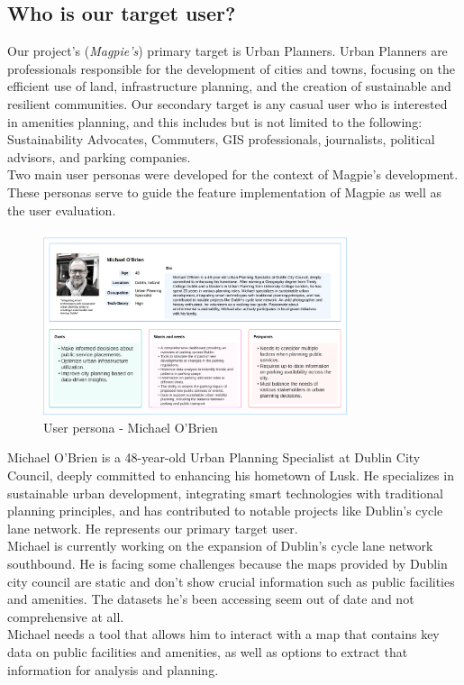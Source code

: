 \subsection{Who is our target user?}
Our project's (\textit{Magpie's}) primary target is Urban Planners. Urban
Planners are professionals responsible for the development of cities and towns,
focusing on the efficient use of land, infrastructure planning, and the creation
of sustainable and resilient communities. Our secondary target is any casual
user who is interested in amenities planning, and this includes but is not
limited to the following: Sustainability Advocates, Commuters, GIS
professionals, journalists, political advisors, and parking companies.\\

Two main user personas were developed for the context of Magpie's development. \\
These personas serve to guide the feature implementation of Magpie as well as the user evaluation.\\
\begin{figure}[h!]
    \centering
    \includegraphics[width=0.8\textwidth]{images/michael-obrien-userpersona.png}
    \caption{User persona - Michael O'Brien}
\end{figure}
Michael O'Brien is a 48-year-old Urban Planning Specialist at Dublin City Council, deeply committed to enhancing his hometown of Lusk. He specializes in sustainable urban development, integrating smart technologies with traditional planning principles, and has contributed to notable projects like Dublin's cycle lane network. He represents our primary target user.\\
Michael is currently working on the expansion of Dublin's cycle lane network southbound. He is facing some challenges because the maps provided by Dublin city council are static and don't show crucial information such as public facilities and amenities. The datasets he's been accessing seem out of date and not comprehensive at all.\\
Michael needs a tool that allows him to interact with a map that contains key data on public facilities and amenities, as well as options to extract that information for analysis and planning.\\

